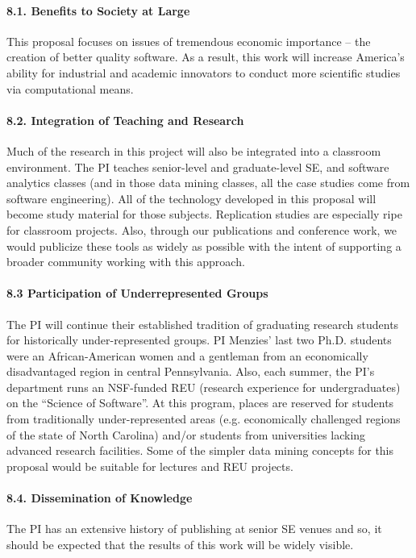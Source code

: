 \paragraph{8.1. Benefits to Society at Large}
This proposal focuses on issues of
tremendous economic importance -- the creation of better quality software.
As a result, this work will increase America's ability for industrial and academic innovators to conduct
more scientific studies via computational means.  
 

\paragraph{8.2. Integration of Teaching and Research}
Much of the research in this project will also be integrated into a
classroom environment.  The PI teaches senior-level and graduate-level
SE, and software analytics   classes (and in those data mining
classes, all the case studies come from software engineering). All of
the technology developed in this proposal will become study
material for those subjects.  Replication studies are especially ripe
for classroom projects.  Also, through our publications and conference
work, we would publicize these tools as widely as possible with the
intent of supporting a broader community working with this approach.

\paragraph{8.3 Participation of Underrepresented
  Groups} The PI will continue their established tradition of
graduating research students for historically under-represented
groups.  PI Menzies' last two Ph.D. students were an African-American
women and a gentleman from an economically disadvantaged region
in central Pennsylvania.  Also, each summer, the PI's department runs an NSF-funded REU
 (research experience for undergraduates)
on the ``Science of Software''.
 At this
program, places are reserved for students from traditionally
under-represented areas (e.g. economically challenged regions of the
state of North Carolina) and/or students from universities
lacking advanced research  facilities.
Some of the simpler data mining concepts for this proposal would be suitable for lectures and REU projects.



%
\paragraph{8.4. Dissemination of Knowledge}
 The PI has an extensive history of publishing at senior SE venues and so, it should be expected
that the results of this work will be widely visible.

